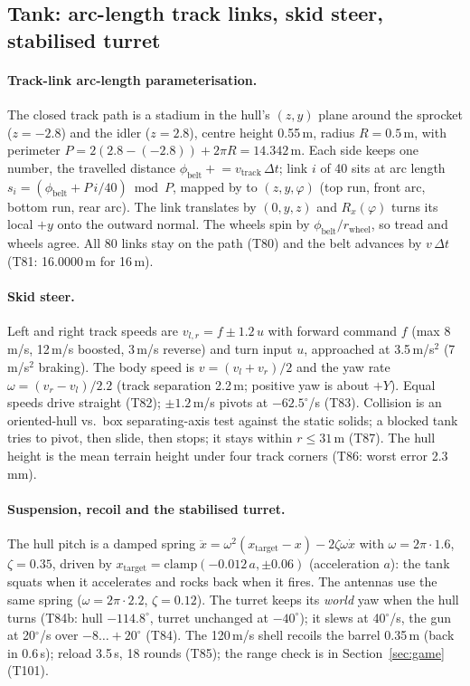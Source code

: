 \subsection{Tank: arc-length track links, skid steer, stabilised turret}
\paragraph{Track-link arc-length parameterisation.} The closed track path is a stadium in the hull's $(z,y)$ plane around the
sprocket ($z=-2.8$) and the idler ($z=2.8$), centre height 0.55\,m, radius $R=0.5$\,m, with perimeter
$P=2(2.8-(-2.8))+2\pi R=14.342$\,m. Each side keeps one number, the travelled distance
$\phi_\text{belt}\mathrel{+}=v_\text{track}\,\Delta t$; link $i$ of 40 sits at arc length
$s_i=(\phi_\text{belt}+P\,i/40)\bmod P$, mapped by  to $(z,y,\varphi)$ (top run, front arc, bottom run, rear arc). The link translates by $(0,y,z)$ and
$R_x(\varphi)$ turns its local $+y$ onto the outward normal. The wheels spin by
$\phi_\text{belt}/r_\text{wheel}$, so tread and wheels agree. All 80 links stay on the path (T80) and the belt advances by $v\,\Delta t$ (T81: 16.0000\,m for 16\,m).

\paragraph{Skid steer.} Left and right track speeds are $v_{l,r}=f\pm1.2\,u$ with forward command $f$ (max 8\,m/s, 12\,m/s boosted, 3\,m/s reverse) and turn input $u$, approached at 3.5\,m/s$^2$ (7\,m/s$^2$ braking). The body speed is
$v=(v_l+v_r)/2$ and the yaw rate $\omega=(v_r-v_l)/2.2$ (track separation 2.2\,m; positive yaw is about $+Y$). Equal speeds drive straight (T82); $\pm1.2$\,m/s pivots at $-62.5^\circ$/s (T83). Collision is an
oriented-hull vs.\ box separating-axis test against the static solids; a blocked tank tries to pivot, then slide, then stops; it stays within $r\le31$\,m (T87).
The hull height is the mean terrain height under four track corners (T86: worst error 2.3\,mm).

\paragraph{Suspension, recoil and the stabilised turret.} The hull pitch is a damped spring
$\ddot x=\omega^2(x_\text{target}-x)-2\zeta\omega\dot x$ with $\omega=2\pi\cdot1.6$, $\zeta=0.35$, driven by
$x_\text{target}=\mathrm{clamp}(-0.012\,a,\pm0.06)$ (acceleration $a$): the tank squats when it accelerates and rocks back when it
fires. The antennas use the same spring ($\omega=2\pi\cdot2.2$, $\zeta=0.12$). The turret keeps its \emph{world} yaw when
the hull turns (T84b: hull $-114.8^\circ$, turret unchanged at $-40^\circ$); it slews at 40$^\circ$/s, the gun at 20$^\circ$/s over
$-8\ldots+20^\circ$ (T84). The 120\,m/s shell recoils the barrel 0.35\,m (back in 0.6\,s); reload 3.5\,s, 18 rounds (T85); the range check is in Section~\ref{sec:game} (T101).

